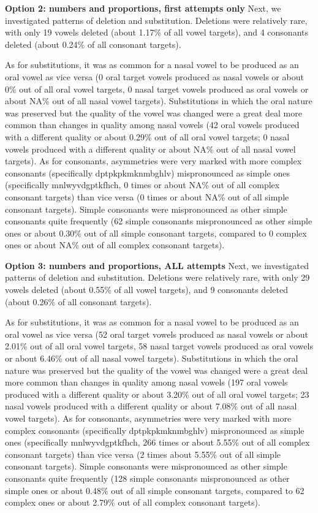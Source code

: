 \documentclass[english,,man,floatsintext]{apa6}
\begin{document}
\textbf{Option 2: numbers and proportions, first attempts only} Next, we
investigated patterns of deletion and substitution. Deletions were
relatively rare, with only 19 vowels deleted (about 1.17\% of all vowel
targets), and 4 consonants deleted (about 0.24\% of all consonant
targets).

As for substitutions, it was as common for a nasal vowel to be produced
as an oral vowel as vice versa (0 oral target vowels produced as nasal
vowels or about 0\% out of all oral vowel targets, 0 nasal target vowels
produced as oral vowels or about NA\% out of all nasal vowel targets).
Substitutions in which the oral nature was preserved but the quality of
the vowel was changed were a great deal more common than changes in
quality among nasal vowels (42 oral vowels produced with a different
quality or about 0.29\% out of all oral vowel targets; 0 nasal vowels
produced with a different quality or about NA\% out of all nasal vowel
targets). As for consonants, asymmetries were very marked with more
complex consonants (specifically dptpkpkmknmbghlv) mispronounced as
simple ones (specifically mnlwyvdgptkfhch, 0 times or about NA\% out of
all complex consonant targets) than vice versa (0 times or about NA\%
out of all simple consonant targets). Simple consonants were
mispronounced as other simple consonants quite frequently (62 simple
consonants mispronounced as other simple ones or about 0.30\% out of all
simple consonant targets, compared to 0 complex ones or about NA\% out
of all complex consonant targets).

\textbf{Option 3: numbers and proportions, ALL attempts} Next, we
investigated patterns of deletion and substitution. Deletions were
relatively rare, with only 29 vowels deleted (about 0.55\% of all vowel
targets), and 9 consonants deleted (about 0.26\% of all consonant
targets).

As for substitutions, it was as common for a nasal vowel to be produced
as an oral vowel as vice versa (52 oral target vowels produced as nasal
vowels or about 2.01\% out of all oral vowel targets, 58 nasal target
vowels produced as oral vowels or about 6.46\% out of all nasal vowel
targets). Substitutions in which the oral nature was preserved but the
quality of the vowel was changed were a great deal more common than
changes in quality among nasal vowels (197 oral vowels produced with a
different quality or about 3.20\% out of all oral vowel targets; 23
nasal vowels produced with a different quality or about 7.08\% out of
all nasal vowel targets). As for consonants, asymmetries were very
marked with more complex consonants (specifically dptpkpkmknmbghlv)
mispronounced as simple ones (specifically mnlwyvdgptkfhch, 266 times or
about 5.55\% out of all complex consonant targets) than vice versa (2
times about 5.55\% out of all simple consonant targets). Simple
consonants were mispronounced as other simple consonants quite
frequently (128 simple consonants mispronounced as other simple ones or
about 0.48\% out of all simple consonant targets, compared to 62 complex
ones or about 2.79\% out of all complex consonant targets).
\end{document}
